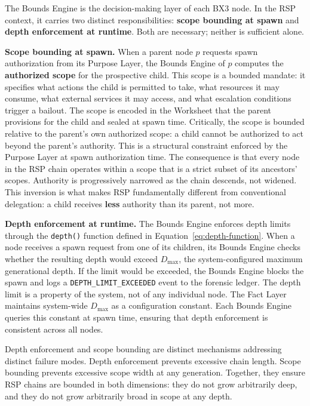 The Bounds Engine is the decision-making layer of each BX3 node. In the RSP context, it carries two distinct responsibilities: \textbf{scope bounding at spawn} and \textbf{depth enforcement at runtime}. Both are necessary; neither is sufficient alone.

\textbf{Scope bounding at spawn.} When a parent node $p$ requests spawn authorization from its Purpose Layer, the Bounds Engine of $p$ computes the \textbf{authorized scope} for the prospective child. This scope is a bounded mandate: it specifies what actions the child is permitted to take, what resources it may consume, what external services it may access, and what escalation conditions trigger a bailout. The scope is encoded in the Worksheet that the parent provisions for the child and sealed at spawn time. Critically, the scope is bounded relative to the parent's own authorized scope: a child cannot be authorized to act beyond the parent's authority. This is a structural constraint enforced by the Purpose Layer at spawn authorization time. The consequence is that every node in the RSP chain operates within a scope that is a strict subset of its ancestors' scopes. Authority is progressively narrowed as the chain descends, not widened. This inversion is what makes RSP fundamentally different from conventional delegation: a child receives \textbf{less} authority than its parent, not more.

\textbf{Depth enforcement at runtime.} The Bounds Engine enforces depth limits through the \texttt{depth()} function defined in Equation~\ref{eq:depth-function}. When a node receives a spawn request from one of its children, its Bounds Engine checks whether the resulting depth would exceed $D_{\max}$, the system-configured maximum generational depth. If the limit would be exceeded, the Bounds Engine blocks the spawn and logs a \texttt{DEPTH\_LIMIT\_EXCEEDED} event to the forensic ledger. The depth limit is a property of the system, not of any individual node. The Fact Layer maintains system-wide $D_{\max}$ as a configuration constant. Each Bounds Engine queries this constant at spawn time, ensuring that depth enforcement is consistent across all nodes.

Depth enforcement and scope bounding are distinct mechanisms addressing distinct failure modes. Depth enforcement prevents excessive chain length. Scope bounding prevents excessive scope width at any generation. Together, they ensure RSP chains are bounded in both dimensions: they do not grow arbitrarily deep, and they do not grow arbitrarily broad in scope at any depth.

